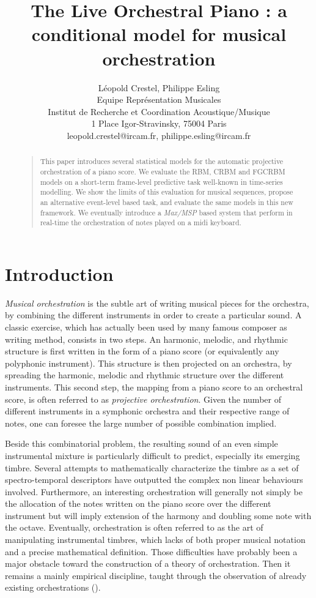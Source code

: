 \documentclass[letterpaper]{article}
\title{The Live Orchestral Piano : a conditional model for musical orchestration}
\author{Léopold Crestel, Philippe Esling\\
Equipe Représentation Musicales\\
Institut de Recherche et Coordination Acoustique/Musique\\
1 Place Igor-Stravinsky, 75004 Paris\\
leopold.crestel@ircam.fr, philippe.esling@ircam.fr\\
}
\begin{document}
 
\maketitle
\begin{abstract}
\begin{quote}
This paper introduces several statistical models for the automatic projective orchestration of a piano score. We evaluate the RBM, CRBM and FGCRBM models on a short-term frame-level predictive task well-known in time-series modelling. We show the limits of this evaluation for musical sequences, propose an alternative event-level based task, and evaluate the same models in this new framework. We eventually introduce a \textit{Max/MSP} based system that perform in real-time the orchestration of notes played on a midi keyboard.
\end{quote}
\end{abstract}

\section{Introduction}
\textit{Musical orchestration} is the subtle art of writing musical pieces for the orchestra, by combining the different instruments in order to create a particular sound. A classic exercise, which has actually been used by many famous composer as writing method, consists in two steps. An harmonic, melodic, and rhythmic structure is first written in the form of a piano score (or equivalently any polyphonic instrument). This structure is then projected on an orchestra, by spreading the harmonic, melodic and rhythmic structure over the different instruments. This second step, the mapping from a piano score to an orchestral score, is often referred to as \textit{projective orchestration}. Given the number of different instruments in a symphonic orchestra and their respective range of notes, one can foresee the large number of possible combination implied.

Beside this combinatorial problem, the resulting sound of an even simple instrumental mixture is particularly difficult to predict, especially its emerging timbre. Several attempts to mathematically characterize the timbre as a set of spectro-temporal descriptors have outputted the complex non linear behaviours involved. Furthermore, an interesting orchestration will generally not simply be the allocation of the notes written on the piano score over the different instrument but will imply extension of the harmony and doubling some note with the octave. Eventually, orchestration is often referred to as the art of manipulating instrumental timbres, which lacks of both proper musical notation and a precise mathematical definition.
Those difficulties have probably been a major obstacle toward the construction of a theory of orchestration. Then it remains a mainly empirical discipline, taught through the observation of already existing orchestrations (\cite{piston-orch}).
\end{document}
